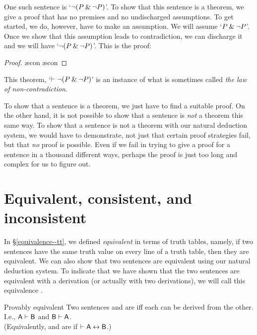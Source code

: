 One such sentence is `${\neg} (P \mathbin{\&} {\neg} P)$'. To show that this sentence is a theorem, we give a proof that has no premises and no undischarged assumptions. To get started, we do, however, have to make an assumption. We will assume `$P \mathbin{\&} {\neg} P$'. Once we show that this assumption leads to contradiction, we can discharge it and we will have `${\neg} (P \mathbin{\&} {\neg} P)$'. This is the proof:
	\begin{proof}
		\open
			\ae{con}
			\ae{con}
		\close
	\end{proof}
This theorem, `$\vdash {\neg} (P \mathbin{\&} {\neg} P)$' is an instance of what is sometimes called \emph{the law of non-contradiction}.

To show that a sentence is a theorem, we just have to find a suitable proof. On the other hand, it is not possible to show that a sentence is \emph{not} a theorem this same way. To show that a sentence is not a theorem with our natural deduction system, we would have to demonstrate, not just that certain proof strategies fail, but that \emph{no} proof is possible. Even if we fail in trying to give a proof for a sentence in a thousand different ways, perhaps the proof is just too long and complex for us to figure out. 


\section{Equivalent, consistent, and inconsistent}

In \S\ref{equivalence--tt}, we defined \textit{equivalent} in terms of truth tables, namely, if two sentences have the same truth value on every line of a truth table, then they are equivalent. We can also show that two sentences are equivalent using our natural deduction system. To indicate that we have shown that the two sentences are equivalent with a derivation (or actually with two derivations), we will call this equivalence . 

\begin{factboxy}{Provably equivalent}
Two sentences  and  are  iff each can be derived from the other. I.e., $\mathsf{A}\vdash\mathsf{B}$ and $\mathsf{B}\vdash\mathsf{A}$.\\
(Equivalently,  and  are  if $\vdash \mathsf{A} \leftrightarrow \mathsf{B}$.)
\end{factboxy}
        
